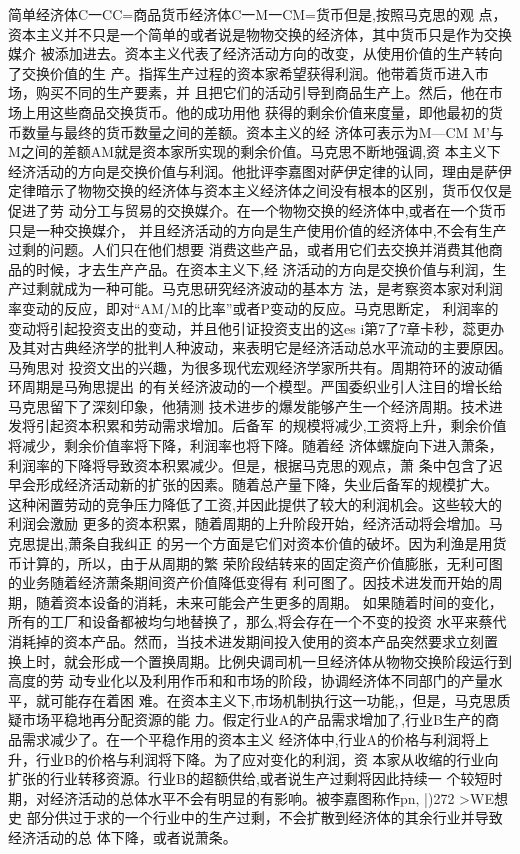 简单经济体C一CC=商品货币经济体C一M一CM=货币但是,按照马克思的观
点，资本主义并不只是一个简单的或者说是物物交换的经济体，其中货币只是作为交换媒介
被添加进去。资本主义代表了经济活动方向的改变，从使用价值的生产转向了交换价值的生
产。指挥生产过程的资本家希望获得利润。他带着货币进入市场，购买不同的生产要素，并
且把它们的活动引导到商品生产上。然后，他在市场上用这些商品交换货币。他的成功用他
获得的剩余价值来度量，即他最初的货币数量与最终的货币数量之间的差额。资本主义的经
济体可表示为M—CM M'与M之间的差额AM就是资本家所实现的剩余价值。马克思不断地强调,资
本主义下经济活动的方向是交换价值与利润。他批评李嘉图对萨伊定律的认同，理由是萨伊
定律暗示了物物交换的经济体与资本主义经济体之间没有根本的区别，货币仅仅是促进了劳
动分工与贸易的交换媒介。在一个物物交换的经济体中,或者在一个货币只是一种交换媒介，
并且经济活动的方向是生产使用价值的经济体中,不会有生产过剩的问题。人们只在他们想要
消费这些产品，或者用它们去交换并消费其他商品的时候，才去生产产品。在资本主义下,经
济活动的方向是交换价值与利润，生产过剩就成为一种可能。马克思研究经济波动的基本方
法，是考察资本家对利润率变动的反应，即对“AM/M的比率”或者P变动的反应。马克思断定，
利润率的变动将引起投资支出的变动，并且他引证投资支出的这es i第7了7章卡秒，蕊更办
及其对古典经济学的批判人种波动，来表明它是经济活动总水平流动的主要原因。马殉思对
投资文出的兴趣，为很多现代宏观经济学家所共有。周期符环的波动循环周期是马殉思提出
的有关经济波动的一个模型。严国委织业引人注目的增长给马克思留下了深刻印象，他猜测
技术进步的爆发能够产生一个经济周期。技术进发将引起资本积累和劳动需求增加。后备军
的规模将减少,工资将上升，剩余价值将减少，剩余价值率将下降，利润率也将下降。随着经
济体螺旋向下进入萧条，利润率的下降将导致资本积累减少。但是，根据马克思的观点，萧
条中包含了迟早会形成经济活动新的扩张的因素。随着总产量下降，失业后备军的规模扩大。
这种闲置劳动的竞争压力降低了工资,并因此提供了较大的利润机会。这些较大的利润会激励
更多的资本积累，随着周期的上升阶段开始，经济活动将会增加。马克思提出,萧条自我纠正
的另一个方面是它们对资本价值的破坏。因为利渔是用货币计算的，所以，由于从周期的繁
荣阶段结转来的固定资产价值膨胀，无利可图的业务随着经济萧条期间资产价值降低变得有
利可图了。因技术进发而开始的周期，随着资本设备的消耗，未来可能会产生更多的周期。
如果随着时间的变化，所有的工厂和设备都被均匀地替换了，那么,将会存在一个不变的投资
水平来蔡代消耗掉的资本产品。然而，当技术进发期间投入使用的资本产品突然要求立刻置
换上时，就会形成一个置换周期。比例央调司机一旦经济体从物物交换阶段运行到高度的劳
动专业化以及利用作币和和市场的阶段，协调经济体不同部门的产量水平，就可能存在着困
难。在资本主义下,市场机制执行这一功能,，但是，马克思质疑市场平稳地再分配资源的能
力。假定行业A的产品需求增加了,行业B生产的商品需求减少了。在一个平稳作用的资本主义
经济体中,行业A的价格与利润将上升，行业B的价格与利润将下降。为了应对变化的利润，资
本家从收缩的行业向扩张的行业转移资源。行业B的超额供给,或者说生产过剩将因此持续一
个较短时期，对经济活动的总体水平不会有明显的有影响。被李嘉图称作pn, |)272 >WE想史
部分供过于求的一个行业中的生产过剩，不会扩散到经济体的其余行业并导致经济活动的总
体下降，或者说萧条。

